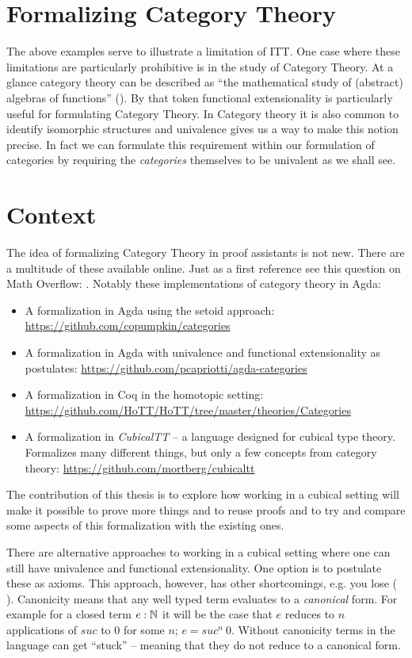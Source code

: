 \section{Formalizing Category Theory}
%
The above examples serve to illustrate a limitation of ITT. One case where these
limitations are particularly prohibitive is in the study of Category Theory. At
a glance category theory can be described as ``the mathematical study of
(abstract) algebras of functions'' (\cite{awodey-2006}). By that token
functional extensionality is particularly useful for formulating Category
Theory. In Category theory it is also common to identify isomorphic structures
and univalence gives us a way to make this notion precise. In fact we can
formulate this requirement within our formulation of categories by requiring the
\emph{categories} themselves to be univalent as we shall see.

\section{Context}
\label{sec:context}
%
The idea of formalizing Category Theory in proof assistants is not new. There
are a multitude of these available online. Just as a first reference see this
question on Math Overflow: \cite{mo-formalizations}. Notably these
implementations of category theory in Agda:
%
\begin{itemize}
\item
  A formalization in Agda using the setoid approach:
  \url{https://github.com/copumpkin/categories}
\item
  A formalization in Agda with univalence and functional
  extensionality as postulates:
  \url{https://github.com/pcapriotti/agda-categories}
\item
  A formalization in Coq in the homotopic setting:
  \url{https://github.com/HoTT/HoTT/tree/master/theories/Categories}
\item
  A formalization in \emph{CubicalTT} -- a language designed for
  cubical type theory. Formalizes many different things, but only a
  few concepts from category theory:
  \url{https://github.com/mortberg/cubicaltt}
\end{itemize}
%
The contribution of this thesis is to explore how working in a cubical setting
will make it possible to prove more things and to reuse proofs and to try and
compare some aspects of this formalization with the existing ones.

There are alternative approaches to working in a cubical setting where
one can still have univalence and functional extensionality. One
option is to postulate these as axioms. This approach, however, has
other shortcomings, e.g. you lose 
( \cite{huber-2016}). Canonicity means that any well
typed term evaluates to a \emph{canonical} form. For example for a
closed term $e \mathrel{:} \mathbb{N}$ it will be the case that $e$ reduces to $n$
applications of $\mathit{suc}$ to $0$ for some $n$; $e =
\mathit{suc}^n\ 0$. Without canonicity terms in the language can get
``stuck'' -- meaning that they do not reduce to a canonical form.

